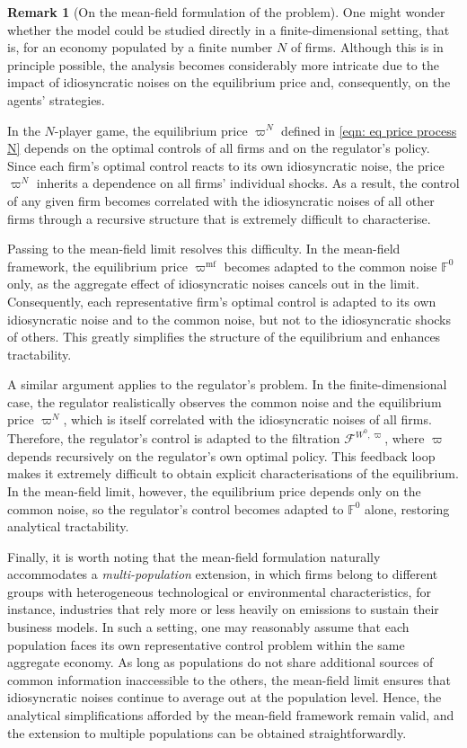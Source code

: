 \documentclass[11pt,twoside]{amsart}
\theoremstyle{definition}
\newtheorem{remark}[theorem]{Remark}
\numberwithin{equation}{section}
\newcommand{\w}{\varpi}
\newcommand{\wmf}{\varpi^{\text{mf}}}
\newcommand{\F}{\mathbb{F}}
\begin{document}
\begin{remark}[On the mean-field formulation of the problem]
\label{rmk: defence of mfg}
One might wonder whether the model could be studied directly in a finite-dimensional setting, that is, for an economy populated by a finite number $N$ of firms. Although this is in principle possible, the analysis becomes considerably more intricate due to the impact of idiosyncratic noises on the equilibrium price and, consequently, on the agents’ strategies. 

In the $N$-player game, the equilibrium price $\w^N$ defined in \eqref{eqn: eq price process N} depends on the optimal controls of all firms and on the regulator’s policy. Since each firm’s optimal control reacts to its own idiosyncratic noise, the price $\w^N$ inherits a dependence on all firms’ individual shocks. As a result, the control of any given firm becomes correlated with the idiosyncratic noises of all other firms through a recursive structure that is extremely difficult to characterise. 

Passing to the mean-field limit resolves this difficulty. In the mean-field framework, the equilibrium price $\wmf$ becomes adapted to the common noise $\F^0$ only, as the aggregate effect of idiosyncratic noises cancels out in the limit. Consequently, each representative firm’s optimal control is adapted to its own idiosyncratic noise and to the common noise, but not to the idiosyncratic shocks of others. This greatly simplifies the structure of the equilibrium and enhances tractability.

A similar argument applies to the regulator’s problem. In the finite-dimensional case, the regulator realistically observes the common noise and the equilibrium price $\w^N$, which is itself correlated with the idiosyncratic noises of all firms. Therefore, the regulator’s control is adapted to the filtration $\mathcal{F}^{W^0, \w}$, where $\w$ depends recursively on the regulator’s own optimal policy. This feedback loop makes it extremely difficult to obtain explicit characterisations of the equilibrium. In the mean-field limit, however, the equilibrium price depends only on the common noise, so the regulator’s control becomes adapted to $\F^0$ alone, restoring analytical tractability.

Finally, it is worth noting that the mean-field formulation naturally accommodates a \emph{multi-population} extension, in which firms belong to different groups with heterogeneous technological or environmental characteristics, for instance, industries that rely more or less heavily on emissions to sustain their business models. In such a setting, one may reasonably assume that each population faces its own representative control problem within the same aggregate economy. As long as populations do not share additional sources of common information inaccessible to the others, the mean-field limit ensures that idiosyncratic noises continue to average out at the population level. Hence, the analytical simplifications afforded by the mean-field framework remain valid, and the extension to multiple populations can be obtained straightforwardly.
\end{remark}
\end{document}
